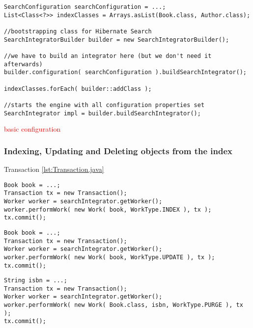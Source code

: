 \lstset{language=java}
\begin{lstlisting}[frame=htrbl, caption={Starting up the engine}, label={lst:starting_up_engine.java}]
SearchConfiguration searchConfiguration = ...;
List<Class<?>> indexClasses = Arrays.asList(Book.class, Author.class);

//bootstrapping class for Hibernate Search
SearchIntegratorBuilder builder = new SearchIntegratorBuilder();

//we have to build an integrator here (but we don't need it afterwards)
builder.configuration( searchConfiguration ).buildSearchIntegrator();

indexClasses.forEach( builder::addClass );

//starts the engine with all configuration properties set
SearchIntegrator impl = builder.buildSearchIntegrator();
\end{lstlisting}

\textcolor{red}{basic configuration}

\subsubsection{Indexing, Updating and Deleting objects from the index}

Transaction \ref{lst:Transaction.java}

\lstset{language=java}
\begin{lstlisting}[frame=htrbl, caption={Indexing an object}, label={lst:indexing_object_native.java}]
Book book = ...;
Transaction tx = new Transaction();
Worker worker = searchIntegrator.getWorker();
worker.performWork( new Work( book, WorkType.INDEX ), tx );
tx.commit();
\end{lstlisting}

\lstset{language=java}
\begin{lstlisting}[frame=htrbl, caption={Updating an object}, label={lst:updating_object_native.java}]
Book book = ...;
Transaction tx = new Transaction();
Worker worker = searchIntegrator.getWorker();
worker.performWork( new Work( book, WorkType.UPDATE ), tx );
tx.commit();
\end{lstlisting}

\lstset{language=java}
\begin{lstlisting}[frame=htrbl, caption={Deleting an object by id}, label={lst:deleting_object_native.java}]
String isbn = ...;
Transaction tx = new Transaction();
Worker worker = searchIntegrator.getWorker();
worker.performWork( new Work( Book.class, isbn, WorkType.PURGE ), tx );
tx.commit();
\end{lstlisting}

